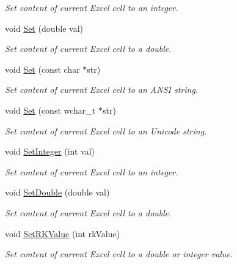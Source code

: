 \begin{DoxyCompactItemize}
\begin{DoxyCompactList}\small\item\em Set content of current Excel cell to an integer. \end{DoxyCompactList}\item 
void \hyperlink{class_y_excel_1_1_basic_excel_cell_a98daa58a6325a20f801579e3bc23282b}{Set} (double val)
\begin{DoxyCompactList}\small\item\em Set content of current Excel cell to a double. \end{DoxyCompactList}\item 
void \hyperlink{class_y_excel_1_1_basic_excel_cell_a5697b81458fa089cedd53451c9188438}{Set} (const char $\ast$str)
\begin{DoxyCompactList}\small\item\em Set content of current Excel cell to an A\+N\+S\+I string. \end{DoxyCompactList}\item 
void \hyperlink{class_y_excel_1_1_basic_excel_cell_a6eb319f73d522972f1136606e77cd773}{Set} (const wchar\+\_\+t $\ast$str)
\begin{DoxyCompactList}\small\item\em Set content of current Excel cell to an Unicode string. \end{DoxyCompactList}\item 
void \hyperlink{class_y_excel_1_1_basic_excel_cell_a443a4516b69479916e26d4a817c295c0}{Set\+Integer} (int val)
\begin{DoxyCompactList}\small\item\em Set content of current Excel cell to an integer. \end{DoxyCompactList}\item 
void \hyperlink{class_y_excel_1_1_basic_excel_cell_a1551d6351baa92be4b053491a7212617}{Set\+Double} (double val)
\begin{DoxyCompactList}\small\item\em Set content of current Excel cell to a double. \end{DoxyCompactList}\item 
void \hyperlink{class_y_excel_1_1_basic_excel_cell_ac74c7f427b9d2db5cebac8614333639f}{Set\+R\+K\+Value} (int rk\+Value)
\begin{DoxyCompactList}\small\item\em Set content of current Excel cell to a double or integer value. \end{DoxyCompactList}\item 

\end{DoxyCompactItemize}
